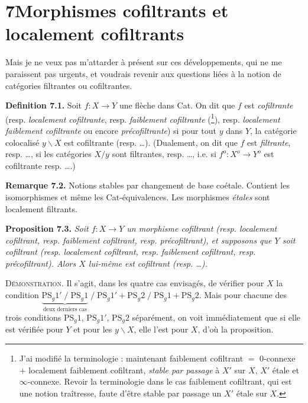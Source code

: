 \documentclass[11pt]{article}
\newcommand{\printedpage}[1]{\marginpar{\footnotesize p.~#1}}
\newcommand{\msp}[1]{\marginpar{\footnotesize [#1]}}
\begin{document}
\printedpage{56}
\msp{page 90}

\section*{7\quad Morphismes cofiltrants et localement cofiltrants}

Mais je ne veux pas m'attarder à présent sur ces développements, qui ne me paraissent pas urgents, et voudrais revenir aux questions liées à la notion de catégories filtrantes ou cofiltrantes.

\textbf{Definition 7.1.} Soit $f : X \longrightarrow Y$ une flèche dans Cat. On dit que $f$ est \textit{cofiltrante} (resp. \textit{localement cofiltrante}, resp. \textit{faiblement cofiltrante} (\footnote[64]{J'ai modifié la terminologie : maintenant faiblement cofiltrant $=$ 0-connexe $+$ localement faiblement cofiltrant, \textit{stable par passage} à $X'$ sur $X$, $X'$ étale et $\infty$-connexe. Revoir la terminologie dans le cas faiblement cofiltrant, qui est une notion traîtresse, faute d'être stable par passage un $X'$ étale sur $X$.}), resp. \textit{localement faiblement cofiltrante} ou encore \textit{précofiltrante}) si pour tout $y$ dans $Y$, la catégorie colocalisé $y\backslash X$ est cofiltrante (resp. \dots). (Dualement, on dit que $f$ est \textit{filtrante}, resp. \dots, si les catégories $X/y$ sont filtrantes, resp. \dots, i.e. si $f^o : X^o \longrightarrow Y^o$ est cofiltrante resp. \dots.) %

\textbf{Remarque 7.2.} Notions stables par changement de base coétale. Contient les isomorphismes et même les Cat-équivalences. Les morphismes \textit{étales} sont localement filtrants.

\textbf{Proposition 7.3.} \textit{Soit $f : X \longrightarrow Y$ un morphisme cofiltrant (resp. localement cofiltrant, resp. faiblement cofiltrant, resp. précofiltrant), et supposons que $Y$ soit cofiltrant (resp. localement cofiltrant, resp. faiblement cofiltrant, resp. précofiltrant). Alors $X$ lui-même est cofiltrant (resp. \dots).}

\textsc{Démonstration}. Il s'agit, dans les quatre cas envisagés, de vérifier pour $X$ la condition $\underbrace{\mathrm{PS}_g1' \;/\; \mathrm{PS}_g1}_{\text{deux derniers cas}} \;/\; \mathrm{PS}_g1' + \mathrm{PS}_g2 \;/\; \mathrm{PS}_g1 + \mathrm{PS}_g2$. Mais \msp{page 91} pour chacune des trois conditions $\mathrm{PS}_g1$, $\mathrm{PS}_g1'$, $\mathrm{PS}_g2$ séparément, on voit immédiatement que si elle est vérifiée pour $Y$ et pour les $y\backslash X$, elle l'est pour $X$, d'où la proposition.
\end{document}

